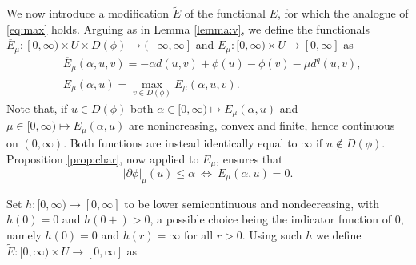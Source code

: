 \documentclass[10pt,a4paper]{amsart}
\newcommand{\ove}{\overline}
\renewcommand{\sl}{|\partial \phi|}
\begin{document}
 We now  introduce a modification
$\tilde E$ of the functional $E$, for which the  analogue  of \eqref{eq:max} holds. 
Arguing as in Lemma \ref{lemma:v}, we define the functionals $\ove E_{ \mu}: [0,\infty) \times U \times
D(\phi) \to (-\infty,\infty]$ and $E_\mu: [0,\infty) \times U \to
[0,\infty]$ as
\begin{align*}
  &\ove E_\mu(\alpha,u,v) = -\alpha d(u,v) + \phi(u)
  -\phi(v)- {\mu} d^q(u,v),\\
  &E_\mu(\alpha,u) = \max_{v\in D(\phi)} \ove E_\mu(\alpha,u,v).
\end{align*}
Note  that, if $u \in D(\phi)$  both $\alpha\in [0,\infty)  \mapsto E_\mu(\alpha,u)$ and
$\mu \in [0,\infty)  \mapsto  E_\mu(\alpha,u)$ are
nonincreasing, convex  and finite,  hence
continuous on  $(0,\infty)$.  Both functions are instead identically equal to $\infty$ if $u \notin D(\phi)$. 
Proposition \ref{prop:char}, now applied to $E_\mu$, ensures that
\begin{equation}\sl_\mu(u) \leq \alpha \ \Leftrightarrow \
E_\mu(\alpha,u)=0.\label{eq:emu}
\end{equation}

Set $h:[0,\infty) \to [0,\infty]$ to be lower semicontinuous and
nondecreasing, with $h(0)=0$ and $h(0+)>0$, a possible choice being the 
indicator
function of $0$, namely $h(0)=0$ and $h(r)=\infty$ for all
$r>0$. Using such $h$ we define
$\tilde E :[0,\infty) \times U \to
[0,\infty]$ as
\end{document}

